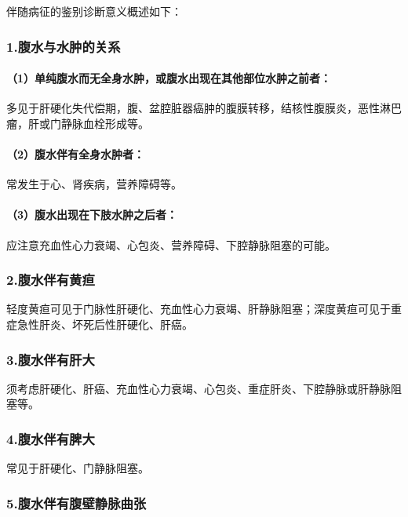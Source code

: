 伴随病征的鉴别诊断意义概述如下：

\subsubsection{1.腹水与水肿的关系}

\paragraph{（1）单纯腹水而无全身水肿，或腹水出现在其他部位水肿之前者：}

多见于肝硬化失代偿期，腹、盆腔脏器癌肿的腹膜转移，结核性腹膜炎，恶性淋巴瘤，肝或门静脉血栓形成等。

\paragraph{（2）腹水伴有全身水肿者：}

常发生于心、肾疾病，营养障碍等。

\paragraph{（3）腹水出现在下肢水肿之后者：}

应注意充血性心力衰竭、心包炎、营养障碍、下腔静脉阻塞的可能。

\subsubsection{2.腹水伴有黄疸}

轻度黄疸可见于门脉性肝硬化、充血性心力衰竭、肝静脉阻塞；深度黄疸可见于重症急性肝炎、坏死后性肝硬化、肝癌。

\subsubsection{3.腹水伴有肝大}

须考虑肝硬化、肝癌、充血性心力衰竭、心包炎、重症肝炎、下腔静脉或肝静脉阻塞等。

\subsubsection{4.腹水伴有脾大}

常见于肝硬化、门静脉阻塞。

\subsubsection{5.腹水伴有腹壁静脉曲张}

